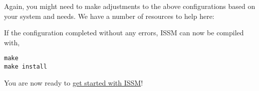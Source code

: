 Again, you might need to make adjustments to the above configurations based on your system and needs. We have a number of resources to help here:

If the configuration completed without any errors, ISSM can now be compiled with,
\begin{lstlisting}
make
make install
\end{lstlisting}

You are now ready to 
\hyperref[chap:getting-started]{get started with ISSM}!

\clearpage %
